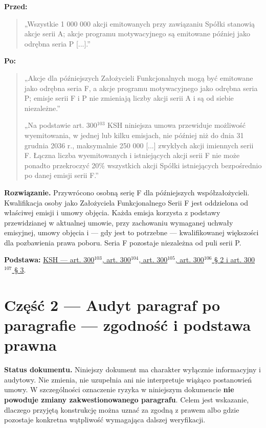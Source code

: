 \documentclass[12pt,a4paper]{report}
\newcounter{paragraf}
\begin{document}
\textbf{Przed:}
\begin{quote}\small
„Wszystkie 1 000 000 akcji emitowanych przy zawiązaniu Spółki stanowią akcje serii A; akcje programu motywacyjnego są emitowane później jako odrębna seria P [...].”
\end{quote}

\textbf{Po:}
\begin{quote}\small
„Akcje dla późniejszych Założycieli Funkcjonalnych mogą być emitowane jako odrębna seria F, a akcje programu motywacyjnego jako odrębna seria P; emisje serii F i P nie zmieniają liczby akcji serii A i są od siebie niezależne.”

„Na podstawie art. 300$^{103}$ KSH niniejsza umowa przewiduje możliwość wyemitowania, w jednej lub kilku emisjach, nie później niż do dnia 31 grudnia 2036 r., maksymalnie 250 000 [...] zwykłych akcji imiennych serii F. Łączna liczba wyemitowanych i istniejących akcji serii F nie może ponadto przekroczyć 20\% wszystkich akcji Spółki istniejących bezpośrednio po danej emisji serii F.”
\end{quote}

\textbf{Rozwiązanie.} Przywrócono osobną serię F dla późniejszych współzałożycieli. Kwalifikacja osoby jako Założyciela Funkcjonalnego Serii F jest oddzielona od właściwej emisji i umowy objęcia. Każda emisja korzysta z podstawy przewidzianej w aktualnej umowie, przy zachowaniu wymaganej uchwały emisyjnej, umowy objęcia i — gdy jest to potrzebne — kwalifikowanej większości dla pozbawienia prawa poboru. Seria F pozostaje niezależna od puli serii P.

\textbf{Podstawa:} \href{https://eli.gov.pl/api/acts/DU/2024/18/text.html}{KSH --- art. 300$^{103}$, art. 300$^{104}$, art. 300$^{105}$, art. 300$^{106}$ § 2 i art. 300$^{107}$ § 3}.



\clearpage
\section*{Część 2 — Audyt paragraf po paragrafie — zgodność i podstawa prawna}
\label{annex:audyt-paragraf-po-paragrafie}

\textbf{Status dokumentu.} Niniejszy dokument ma charakter wyłącznie informacyjny i audytowy. Nie zmienia, nie uzupełnia ani nie interpretuje wiążąco postanowień umowy. W szczególności oznaczenie ryzyka w niniejszym dokumencie \textbf{nie powoduje zmiany zakwestionowanego paragrafu}. Celem jest wskazanie, dlaczego przyjętą konstrukcję można uznać za zgodną z prawem albo gdzie pozostaje konkretna wątpliwość wymagająca dalszej weryfikacji.
\end{document}
